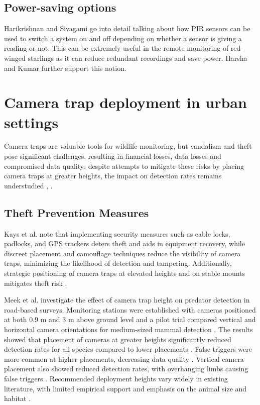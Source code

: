 \documentclass[class=report,11pt,crop=false]{standalone}
\begin{document}
\subsection{Power-saving options}


Harikrishnan and Sivagami \cite{harikirshnan2017intelligent} go into detail talking about how PIR sensors can be used to switch a system on and off depending on whether a sensor is giving a reading or not. This can be extremely useful in the remote monitoring of red-winged starlings as it can reduce redundant recordings and save power. Harsha and Kumar \cite{harsha2020home} further support this notion.


\section{Camera trap deployment in urban settings} 

Camera traps are valuable tools for wildlife monitoring, but vandalism and theft pose significant challenges, resulting in financial losses, data losses and compromised data quality; despite attempts to mitigate these risks by placing camera traps at greater heights, the impact on detection rates remains understudied \cite{meek2016higher}, \cite{meek2019camera}.


\subsection{Theft Prevention Measures} 

Kays et al. \cite{kays2009camera} note that implementing security measures such as cable locks, padlocks, and GPS trackers deters theft and aids in equipment recovery, while discreet placement and camouflage techniques reduce the visibility of camera traps, minimizing the likelihood of detection and tampering. Additionally, strategic positioning of camera traps at elevated heights and on stable mounts mitigates theft risk \cite{kays2009camera}. 

Meek et al. \cite{meek2016higher} investigate the effect of camera trap height on predator detection in road-based surveys. Monitoring stations were established with cameras positioned at both 0.9 m and 3 m above ground level and a pilot trial compared vertical and horizontal camera orientations for medium-sized mammal detection \cite{meek2016higher}. The results showed that placement of cameras at greater heights significantly reduced detection rates for all species compared to lower placements \cite{meek2016higher}. False triggers were more common at higher placements, decreasing data quality \cite{meek2016higher}. Vertical camera placement also showed reduced detection rates, with overhanging limbs causing false triggers \cite{meek2016higher}. Recommended deployment heights vary widely in existing literature, with limited empirical support and emphasis on the animal size and habitat \cite{meek2016higher}. 
\end{document}
